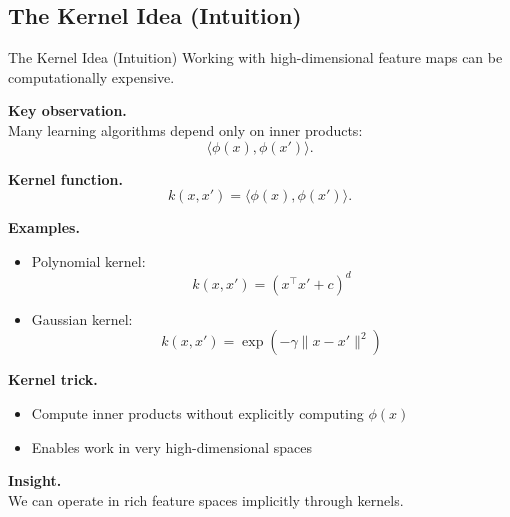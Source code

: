 \documentclass[aspectratio=169,11pt]{beamer}
\begin{document}
\subsection{The Kernel Idea (Intuition)}
\begin{frame}[t,allowframebreaks]{The Kernel Idea (Intuition)}
\small
Working with high-dimensional feature maps can be computationally expensive.

\textbf{Key observation.}\\ Many learning algorithms depend only on inner products:
\[
\langle \phi(x), \phi(x') \rangle.
\]

\textbf{Kernel function.}\\ \[
k(x, x') = \langle \phi(x), \phi(x') \rangle.
\]

\textbf{Examples.}\\ \begin{itemize}
    \item Polynomial kernel:
    \[
    k(x, x') = (x^\top x' + c)^d
    \]

    \item Gaussian kernel:
    \[
    k(x, x') = \exp(-\gamma \|x - x'\|^2)
    \]
\end{itemize}

\textbf{Kernel trick.}\\ \begin{itemize}
    \item Compute inner products without explicitly computing $\phi(x)$
    \item Enables work in very high-dimensional spaces
\end{itemize}

\textbf{Insight.}\\ We can operate in rich feature spaces implicitly through kernels.
\end{frame}
\end{document}
